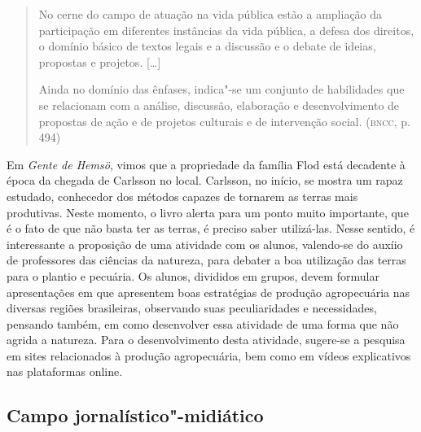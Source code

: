 \documentclass[12pt]{extarticle}
\begin{document}
\begin{quote}
No cerne do campo de atuação na vida pública estão a ampliação da
participação em diferentes instâncias da vida pública, a defesa dos
direitos, o domínio básico de textos legais e a discussão e o debate de
ideias, propostas e projetos. {[}\ldots{}{]}

Ainda no domínio das ênfases, indica"-se um conjunto de habilidades que
se relacionam com a análise, discussão, elaboração e desenvolvimento de
propostas de ação e de projetos culturais e de intervenção social.
(\textsc{bncc}, p. 494)
\end{quote}

Em \emph{Gente de Hemsö}, vimos que a propriedade da família Flod está
decadente à época da chegada de Carlsson no local. Carlsson, no
início, se mostra um rapaz estudado, conhecedor dos métodos capazes de
tornarem as terras mais produtivas. Neste momento, o livro alerta para
um ponto muito importante, que é o fato de que não basta ter as
terras, é preciso saber utilizá-las. Nesse sentido, é interessante a
proposição de uma atividade com os alunos, valendo-se do auxíio de
professores das ciências da natureza, para debater a boa utilização
das terras para o plantio e pecuária. Os alunos, divididos em grupos,
devem formular apresentações em que apresentem boas estratégias de
produção agropecuária nas diversas regiões brasileiras, observando
suas peculiaridades e necessidades, pensando também, em como
desenvolver essa atividade de uma forma que não agrida a natureza.
Para o desenvolvimento desta atividade, sugere-se a pesquisa em sites
relacionados à produção agropecuária, bem como em vídeos explicativos
nas plataformas online.

\subsection{Campo jornalístico"-midiático}
\end{document}
